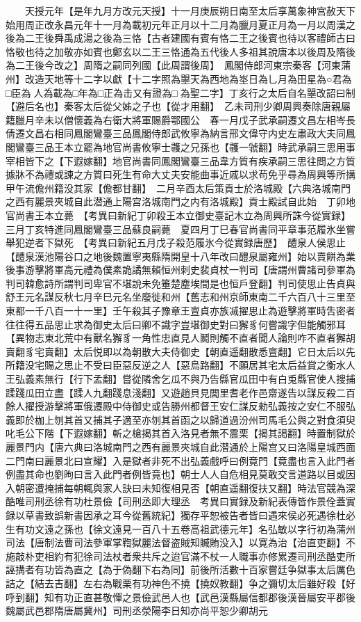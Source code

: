 　　天授元年【是年九月方改元天授】十一月庚辰朔日南至太后享萬象神宫赦天下始用周正改永昌元年十一月為載初元年正月以十二月為臘月夏正月為一月以周漢之後為二王後舜禹成湯之後為三恪【古者建國有賓有恪二王之後賓也待以客禮師古曰恪敬也待之加敬亦如賓也鄭玄以二王三恪通為五代後人多祖其說唐本以後周及隋後為二王後今改之】周隋之嗣同列國【此周謂後周】　鳳閣侍郎河東宗秦客【河東蒲州】改造天地等十二字以獻【十二字照為曌天為西地為埊日為乚月為田星為○君為□臣為人為載為□年為□正為击又有證為□為聖二字】丁亥行之太后自名曌改詔曰制【避后名也】秦客太后從父姊之子也【從才用翻】　乙未司刑少卿周興奏除唐親屬籍臘月辛未以僧懷義為右衛大將軍賜爵鄂國公　春一月戊子武承嗣遷文昌左相岑長倩遷文昌右相同鳳閣鸞臺三品鳳閣侍郎武攸寧為納言邢文偉守内史左肅政大夫同鳳閣鸞臺三品王本立罷為地官尚書攸寧士彠之兄孫也【彠一虢翻】時武承嗣三思用事宰相皆下之【下遐嫁翻】地官尚書同鳳閣鸞臺三品韋方質有疾承嗣三思往問之方質據牀不為禮或諫之方質曰死生有命大丈夫安能曲事近戚以求苟免乎尋為周興等所搆甲午流儋州籍没其家【儋都甘翻】　二月辛酉太后策貢士於洛城殿【六典洛城南門之西有麗景夾城自此潜通上陽宫洛城南門之内有洛城殿】貢士殿試自此始　丁卯地官尚書王本立薨　【考異曰新紀丁卯殺王本立御史臺記木立為周興所誅今從實録】　三月丁亥特進同鳳閣鸞臺三品蘇良嗣薨　夏四月丁巳春官尚書同平章事范履氷坐嘗舉犯逆者下獄死　【考異曰新紀五月戊子殺范履氷今從實録唐歷】　醴泉人侯思止【醴泉漢池陽谷口之地後魏置寧夷縣隋開皇十八年改曰醴泉屬雍州】始以賣餅為業後事游擊將軍高元禮為僕素詭譎無賴恒州刺史裴貞杖一判司【唐謂州曹諸司參軍為判司韓愈詩所謂判司卑官不堪說未免箠楚塵埃間是也恒戶登翻】判司使思止告貞與舒王元名謀反秋七月辛巳元名坐廢徙和州【舊志和州京師東南二千六百八十三里至東都一千八百一十一里】壬午殺其子豫章王亶貞亦族㓕擢思止為遊擊將軍時吿密者往往得五品思止求為御史太后曰卿不識字豈堪御史對曰獬豸何嘗識字但能觸邪耳【異物志東北荒中有獸名獬豸一角性忠直見人鬭則觸不直者聞人論則咋不直者獬胡賣翻豸宅賣翻】太后悦即以為朝散大夫侍御史【朝直遥翻散悉亶翻】它日太后以先所籍没宅賜之思止不受曰臣惡反逆之人【惡烏路翻】不願居其宅太后益賞之衡水人王弘義素無行【行下孟翻】嘗從隣舍乞瓜不與乃告縣官瓜田中有白兎縣官使人搜捕蹂踐瓜田立盡【蹂人九翻踐息淺翻】又遊趙貝見閭里耆老作邑齋遂告以謀反殺二百餘人擢授游擊將軍俄遷殿中侍御史或告勝州都督王安仁謀反勑弘義按之安仁不服弘義即於枷上刎其首又捕其子適至亦刎其首函之以歸道過汾州司馬毛公與之對食須臾叱毛公下階【下遐嫁翻】斬之槍揭其首入洛見者無不震栗【揭其謁翻】時置制獄於麗景門内【唐六典曰洛城南門之西有麗景夾城自此潜通於上陽宫又曰洛陽皇城西面二門南曰麗景北曰宣耀】入是獄者非死不出弘義戲呼曰例竟門【竟盡也言入此門者例盡其命也劉昫曰言入此門者例皆竟也】朝士人人自危相見莫敢交言道路以目或因入朝密遭掩捕每朝輒與家人訣曰未知復相見否【朝直遥翻復扶又翻】時法官競為深酷唯司刑丞徐有功杜景儉【司刑丞即大理丞　考異曰實録及新紀表傳皆作景佺蓋實録以草書致誤新書因承之耳今從舊統紀】獨存平恕被告者皆曰遇來侯必死遇徐杜必生有功文遠之孫也【徐文遠見一百八十五卷高祖武德元年】名弘敏以字行初為蒲州司法【唐制法曹司法參軍掌鞫獄麗法督盗賊知贓賄没入】以寛為治【治直吏翻】不施敲朴吏相約有犯徐司法杖者衆共斥之迨官滿不杖一人職事亦修累遷司刑丞酷吏所誣搆者有功皆為直之【為于偽翻下右為同】前後所活數十百家嘗廷争獄事太后厲色詰之【結去吉翻】左右為戰栗有功神色不撓【撓奴教翻】争之彌切太后雖好殺【好呼到翻】知有功正直甚敬憚之景儉武邑人也【武邑漢縣屬信都郡後漢晉屬安平郡後魏屬武邑郡隋唐屬冀州】司刑丞滎陽李日知亦尚平恕少卿胡元